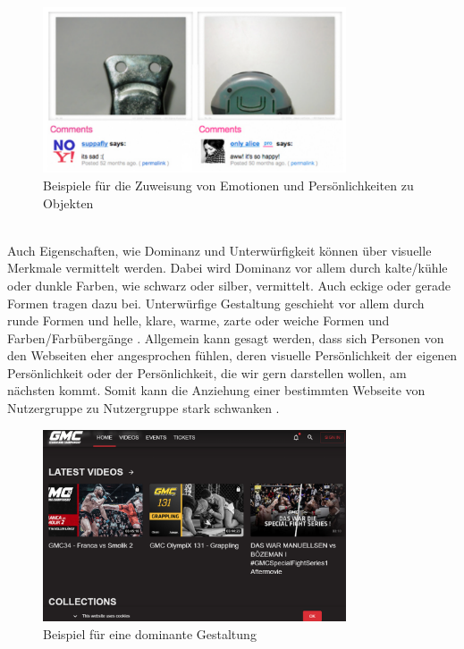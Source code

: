 \documentclass[./dokumentation.tex]{subfiles}
\begin{document}
\begin{figure}[H]
    \centering
    \includegraphics[width=0.8\textwidth]{bilder/sad-happy.png}
    \caption{Beispiele für die Zuweisung von Emotionen und Persönlichkeiten zu Objekten}
    \label{fig6:happy}
\end{figure}\\

Auch Eigenschaften, wie Dominanz und Unterwürfigkeit können über visuelle Merkmale vermittelt werden. Dabei wird Dominanz vor allem durch kalte/kühle oder dunkle Farben, wie schwarz oder silber, vermittelt. Auch eckige oder gerade Formen tragen dazu bei. Unterwürfige Gestaltung geschieht vor allem durch runde Formen und helle, klare, warme, zarte oder weiche Formen und Farben/Farbübergänge \cite{DesignEmo2003}. Allgemein kann gesagt werden, dass sich Personen von den Webseiten eher angesprochen fühlen, deren visuelle Persönlichkeit der eigenen Persönlichkeit oder der Persönlichkeit, die wir gern darstellen wollen, am nächsten kommt. Somit kann die Anziehung einer bestimmten Webseite von Nutzergruppe zu Nutzergruppe stark schwanken \cite{vanGorp2013}. \\

\begin{figure}[H]
    \centering
    \includegraphics[width=0.8\textwidth]{bilder/dom.png}
    \caption{Beispiel für eine dominante Gestaltung \cite{dom_bsp}}
    \label{fig7:dom}
\end{figure}\\
\end{document}
